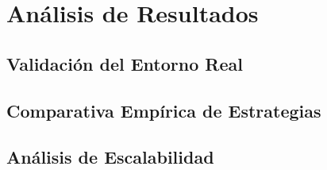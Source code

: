 \chapter{Análisis de Resultados}

\section{Validación del Entorno Real}

\section{Comparativa Empírica de Estrategias}

\section{Análisis de Escalabilidad}
